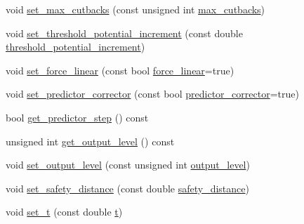 \begin{DoxyCompactItemize}
\item 
void \hyperlink{classincremental_f_e_1_1_global_data_incremental_f_e_a892280978280b21be48bafed07d7c60a}{set\+\_\+max\+\_\+cutbacks} (const unsigned int \hyperlink{classincremental_f_e_1_1_global_data_incremental_f_e_a7ae58573e9cc241a14976bf19351ba63}{max\+\_\+cutbacks})
\item 
void \hyperlink{classincremental_f_e_1_1_global_data_incremental_f_e_a09f0851c50886a9f57996558c08fc108}{set\+\_\+threshold\+\_\+potential\+\_\+increment} (const double \hyperlink{classincremental_f_e_1_1_global_data_incremental_f_e_a2f7adb8b4f7f8875715e1dbd0edd9ac8}{threshold\+\_\+potential\+\_\+increment})
\item 
void \hyperlink{classincremental_f_e_1_1_global_data_incremental_f_e_aba65d5da0031c2f1bc1ceb87dc524b8d}{set\+\_\+force\+\_\+linear} (const bool \hyperlink{classincremental_f_e_1_1_global_data_incremental_f_e_a37c1d42902e74f13f3c4ba82d2dabd67}{force\+\_\+linear}=true)
\item 
void \hyperlink{classincremental_f_e_1_1_global_data_incremental_f_e_a82d4ae6026b8c8a4a4da1c54e81fd64a}{set\+\_\+predictor\+\_\+corrector} (const bool \hyperlink{classincremental_f_e_1_1_global_data_incremental_f_e_a5cc0d20e5e389c149bbd288f57dee953}{predictor\+\_\+corrector}=true)
\item 
bool \hyperlink{classincremental_f_e_1_1_global_data_incremental_f_e_a6814f2a2bf9f3369b9d1ea7ee8cab33a}{get\+\_\+predictor\+\_\+step} () const 
\item 
unsigned int \hyperlink{classincremental_f_e_1_1_global_data_incremental_f_e_a5d95155e9cc3cae28a5fbe7866f603d7}{get\+\_\+output\+\_\+level} () const 
\item 
void \hyperlink{classincremental_f_e_1_1_global_data_incremental_f_e_a44ec19d072819c3531be56ada4b7d077}{set\+\_\+output\+\_\+level} (const unsigned int \hyperlink{classincremental_f_e_1_1_global_data_incremental_f_e_a0d5cf3ecf70ec61771bbcfe45d0e6b5d}{output\+\_\+level})
\item 
void \hyperlink{classincremental_f_e_1_1_global_data_incremental_f_e_a916e33b7d8d6dcc1a113c130c995f8b3}{set\+\_\+safety\+\_\+distance} (const double \hyperlink{classincremental_f_e_1_1_global_data_incremental_f_e_a6db92e8e97c6875df1ecf5aa2a3a0345}{safety\+\_\+distance})
\item 
void \hyperlink{classincremental_f_e_1_1_global_data_incremental_f_e_a27354ebc5bf9ec655f5c7cc16ac9876d}{set\+\_\+t} (const double \hyperlink{classincremental_f_e_1_1_global_data_incremental_f_e_abb14e15389af3772905a3c75e12ed2c0}{t})

\end{DoxyCompactItemize}
